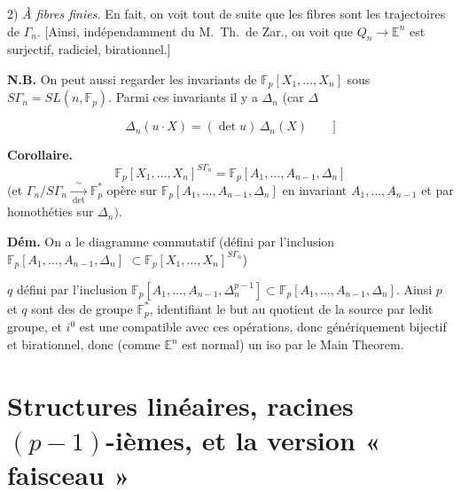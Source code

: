 \documentclass[11pt,a4paper]{article}
\begin{document}
2) \emph{À fibres finies.} En fait, on voit tout de suite que les fibres
sont les trajectoires de $\Gamma_n$. [Ainsi, indépendamment du M.\ Th.\ de Zar., on
voit que $Q_n \to \mathbb{E}^n$ est surjectif, radiciel, birationnel.]

\textbf{N.B.} On peut aussi regarder les invariants de
$\mathbb{F}_p[X_1, \dots, X_n]$ sous $S\Gamma_n = SL(n, \mathbb{F}_p)$.
Parmi ces invariants il y a $\Delta_n$ (car \ill{} $\Delta$ 

\[
  \Delta_n(u \cdot X) = (\det u)\,\Delta_n(X) \qquad ]
\]


\textbf{Corollaire.} \struck{\ill{}}
\[
  \mathbb{F}_p[X_1, \dots, X_n]^{S\Gamma_n} = \mathbb{F}_p[A_1, \dots, A_{n-1}, \Delta_n]
\]
$\bigl($et $\Gamma_n/S\Gamma_n \xrightarrow[\ \det\ ]{\ \sim\ } \mathbb{F}_p^*$ opère
sur $\mathbb{F}_p[A_1, \dots, A_{n-1}, \Delta_n]$ en invariant $A_1, \dots, A_{n-1}$
et par homothéties sur $\Delta_n\bigr)$.

\textbf{Dém.}
On a le diagramme commutatif (défini par l'inclusion
$\mathbb{F}_p[A_1, \dots, A_{n-1}, \Delta_n]$
$\subset \mathbb{F}_p[X_1, \dots, X_n]^{S\Gamma_n}$)


$q$ défini par l'inclusion
$\mathbb{F}_p[A_1, \dots, A_{n-1}, \Delta_n^{p-1}] \subset \mathbb{F}_p[A_1, \dots, A_{n-1}, \Delta_n]$.
Ainsi $p$ et $q$ sont des  de groupe $\mathbb{F}_p^*$,
identifiant le but au quotient de la source par ledit groupe, et $i^0$ est une
\ill{} compatible avec ces opérations, donc génériquement bijectif et
birationnel, donc (comme $\mathbb{E}^n$ est normal) un iso par le Main Theorem.

\section*{Structures linéaires, racines $(p-1)$-ièmes, et la version « faisceau »}
\end{document}

